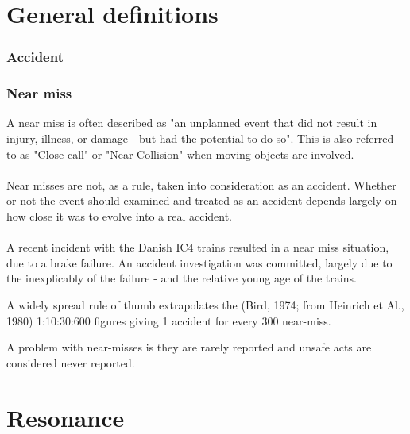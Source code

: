 
\section{General definitions}

\subsubsection*{Accident}

\subsubsection*{Near miss}
\label{sec:near_miss}
A near miss is often described as "an unplanned event that did not result in injury, illness, or damage - but had the potential to do so". This is also referred to as "Close call" or "Near Collision" when moving objects are involved.\\
\\
Near misses are not, as a rule, taken into consideration as an accident. Whether or not the event should examined and treated as an accident depends largely on how close it was to evolve into a real accident.\\
\\
A recent incident with the Danish IC4 trains resulted in a near miss situation, due to a brake failure. An accident investigation was committed, largely due to the inexplicably of the failure - and the relative young age of the trains.

A widely spread rule of thumb extrapolates the (Bird, 1974; from Heinrich et Al., 1980) 1:10:30:600 figures giving 1 accident for every 300 near-miss.

A problem with near-misses is they are rarely reported and unsafe acts are considered never reported.

\section{Resonance}

